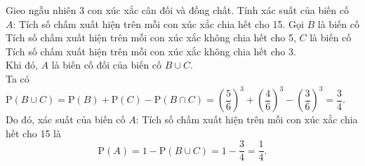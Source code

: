 \begin{vd}%
	Gieo ngẫu nhiên 3 con xúc xắc cân đối và đồng chất. Tính xác suất của biến cố 
	$A$: \text{\lq\lq}Tích số chấm xuất hiện trên mỗi con xúc xắc chia hết cho 15\text{\rq\rq}.
	\loigiai
	{
		Gọi $B$ là biến cố \text{\lq\lq}Tích số chấm xuất hiện trên mỗi con xúc xắc không chia hết cho 5\text{\rq\rq}, $C$ là biến cố \text{\lq\lq}Tích số chấm xuất hiện trên mỗi con xúc xắc không chia hết cho 3\text{\rq\rq}.\\
		Khi đó, $A$ là biến cố đối của biến cố $B\cup C$.\\
		Ta có $\mathrm{P}(B\cup C)=\mathrm{P}(B)+\mathrm{P}(C)-\mathrm{P}(B\cap C)=\left(\dfrac{5}{6}\right)^3+\left(\dfrac{4}{6}\right)^3-\left(\dfrac{3}{6}\right)^3=\dfrac{3}{4}$.\\
		Do đó, xác suất của biến cố $A$: \text{\lq\lq}Tích số chấm xuất hiện trên mỗi con xúc xắc chia hết cho 15\text{\rq\rq} là 
		\[\mathrm{P}(A)=1-\mathrm{P}(B \cup C)=1-\dfrac{3}{4}=\dfrac{1}{4}.\]
	}
\end{vd}

